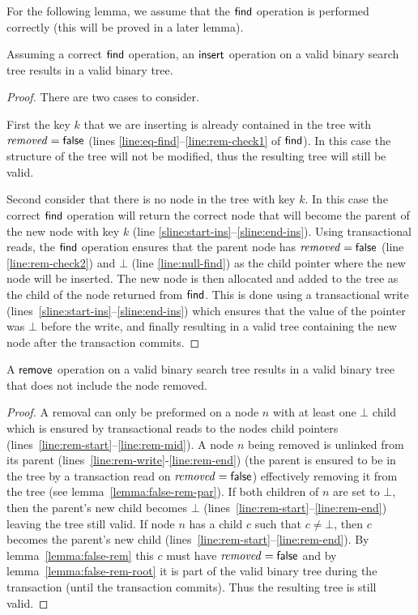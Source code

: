 For the following lemma, we assume that the $\act{find}$ operation is performed correctly (this will be proved in a later lemma).

\begin{lemma}
\label{lemma:insert-valid1}
Assuming a correct $\act{find}$ operation, an $\act{insert}$ operation on a valid binary search tree results in a valid binary tree.%
\end{lemma}
\begin{proof}
There are two cases to consider.

First the key $k$ that we are inserting is already contained in the tree with $\ms{removed}=\lit{false}$ (lines \ref{line:eq-find}--\ref{line:rem-check1} of $\act{find}$).
In this case the structure of the tree will not be modified, thus the resulting tree will still be valid.

Second consider that there is no node in the tree with key $k$.
In this case the correct $\act{find}$ operation will return the correct node that will become the parent of the new node with key $k$ (line \ref{sline:start-ins}--\ref{sline:end-ins}).
Using transactional reads, the $\act{find}$ operation ensures that the parent node has $\ms{removed}=\lit{false}$ (line \ref{line:rem-check2}) and $\bot$
(line \ref{line:null-find}) as the child pointer where the new
node will be inserted.
The new node is then allocated and added to the tree as the child of the node returned from $\act{find}$.
This is done using a transactional write (lines~\ref{sline:start-ins}--\ref{sline:end-ins}) which ensures that the value of the pointer was $\bot$ before the write,
and finally resulting in a valid tree containing the new node after the transaction commits.
\end{proof}


\begin{lemma}
\label{lemma:remove-valid}
A $\act{remove}$ operation on a valid binary search tree results in a valid binary tree that does not include the node removed.
\end{lemma}
\begin{proof}
A removal can only be preformed on a node $n$ with at least one $\bot$ child which is ensured by transactional reads to the
nodes child pointers (lines~\ref{line:rem-start}--\ref{line:rem-mid}).
A node $n$ being removed is unlinked from its parent (lines~\ref{line:rem-write}-\ref{line:rem-end})
(the parent is ensured to be in the tree by a transaction read on $\ms{removed}=\lit{false}$) effectively removing it from the tree (see lemma~\ref{lemma:false-rem-par}).
If both children of $n$ are set to $\bot$, then the parent's new child becomes $\bot$ (lines~\ref{line:rem-start}--\ref{line:rem-end}) leaving the tree still valid.
If node $n$ has a child $c$ such that $c\neq \bot$, then $c$ becomes the parent's new child 
(lines~\ref{line:rem-start}--\ref{line:rem-end}).
By lemma~\ref{lemma:false-rem} this $c$ must have $\ms{removed}=\lit{false}$ and by lemma~\ref{lemma:false-rem-root} it is part of the valid binary tree during the transaction (until the transaction commits).
Thus the resulting tree is still valid.
\end{proof}

